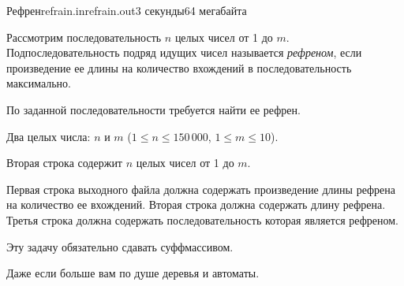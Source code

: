 \begin{problem}{Рефрен}{refrain.in}{refrain.out}{3 секунды}{64 мегабайта}

Рассмотрим последовательность $n$ целых чисел от 1 до $m$. 
Подпоследовательность подряд
идущих чисел называется \emph{рефреном}, если произведение ее длины
на количество вхождений в последовательность максимально. 

По заданной последовательности требуется найти ее рефрен.

\InputFile

Два целых числа: $n$ и $m$ ($1 \le n \le 150\,000$, $1 \le m \le 10$).

Вторая строка содержит $n$ целых чисел от 1 до $m$.

\OutputFile

Первая строка выходного файла должна содержать произведение
длины рефрена на количество ее вхождений. Вторая строка должна
содержать длину рефрена. Третья строка должна содержать 
последовательность которая является рефреном.

\Example

\begin{example}%
%
\end{example}

\Note

Эту задачу обязательно сдавать суффмассивом.

Даже если больше вам по душе деревья и автоматы.

\end{problem}
